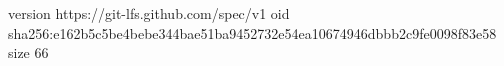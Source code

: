 version https://git-lfs.github.com/spec/v1
oid sha256:e162b5c5be4bebe344bae51ba9452732e54ea10674946dbbb2c9fe0098f83e58
size 66
